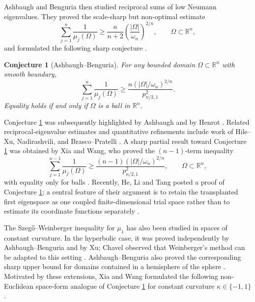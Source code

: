 \documentclass[10pt,a4paper]{amsart}
\newtheorem{conjecture}[theorem]{Conjecture}
\newcommand{\RR}{\mathbb R}
\begin{document}
Ashbaugh and Benguria then studied reciprocal sums of low Neumann eigenvalues.  They proved the scale-sharp but non-optimal estimate
$$
        \sum_{j=1}^n\frac1{\mu_j(\Omega)}
        \ge \frac{n}{n+2}\left(\frac{|\Omega|}{\omega_n}\right)^{2/n},
        \qquad \Omega\subset\RR^n,
$$
and formulated the following sharp conjecture \cite{AB1993}.

\begin{conjecture}[Ashbaugh--Benguria]\label{conj:AB-euclidean}
For any bounded domain $\Omega\subset\RR^n$ with smooth boundary,
\begin{equation*}
        \sum_{j=1}^n\frac1{\mu_j(\Omega)}
        \ge
        \frac{n(|\Omega|/\omega_n)^{2/n}}{p_{n/2,1}^2}.
\end{equation*}
Equality holds if and only if $\Omega$ is a ball in $\RR^n$.
\end{conjecture}

Conjecture \ref{conj:AB-euclidean} was subsequently highlighted by Ashbaugh and by Henrot \cite{AshbaughOpen,Henrot}.  Related reciprocal-eigenvalue estimates and quantitative refinements include work of Hile--Xu, Nadirashvili, and Brasco--Pratelli \cite{HileXu,Nadirashvili,BrascoPratelli}.  A sharp partial result toward Conjecture \ref{conj:AB-euclidean} was obtained by Xia and Wang, who proved the $(n-1)$-term inequality
$$
        \sum_{j=1}^{n-1}\frac1{\mu_j(\Omega)}
        \ge
        \frac{(n-1)(|\Omega|/\omega_n)^{2/n}}{p_{n/2,1}^2},
        \qquad \Omega\subset\RR^n,
$$
with equality only for balls \cite{XiaWang}.  Recently, He, Li and Tang posted a proof of Conjecture \ref{conj:AB-euclidean}; a central feature of their argument is to retain the transplanted first eigenspace as one coupled finite-dimensional trial space rather than to estimate its coordinate functions separately \cite{HeLiTang}.

The Szeg\H{o}--Weinberger inequality for $\mu_1$ has also been studied in spaces of constant curvature.  In the hyperbolic case, it was proved independently by Ashbaugh--Benguria and by Xu; Chavel observed that Weinberger's method can be adapted to this setting \cite{AB1995,Xu,Chavel}.  Ashbaugh--Benguria also proved the corresponding sharp upper bound for domains contained in a hemisphere of the sphere \cite{AB1995}.  Motivated by these extensions, Xia and Wang formulated the following  non-Euclidean space-form analogue of Conjecture \ref{conj:AB-euclidean} for constant curvature $\kappa\in\{-1,1\}$ \cite{XiaWang}.
\end{document}
